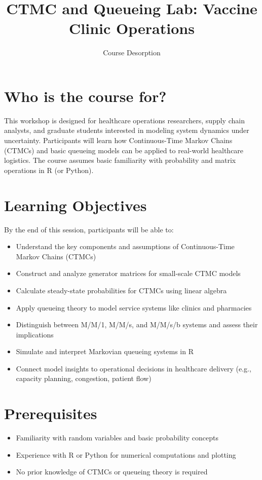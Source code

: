 \documentclass[
]{article}
\title{CTMC and Queueing Lab: Vaccine Clinic Operations}
\subtitle{Course Desorption}
\author{}
\date{}
\providecommand{\tightlist}{%
  \setlength{\itemsep}{0pt}\setlength{\parskip}{0pt}}\usepackage{longtable,booktabs,array}
\begin{document}
\maketitle


\section{Who is the course for?}\label{who-is-the-course-for}

This workshop is designed for healthcare operations researchers, supply
chain analysts, and graduate students interested in modeling system
dynamics under uncertainty. Participants will learn how Continuous-Time
Markov Chains (CTMCs) and basic queueing models can be applied to
real-world healthcare logistics. The course assumes basic familiarity
with probability and matrix operations in R (or Python).

\section{Learning Objectives}\label{learning-objectives}

By the end of this session, participants will be able to:

\begin{itemize}
\tightlist
\item
  Understand the key components and assumptions of Continuous-Time
  Markov Chains (CTMCs)
\item
  Construct and analyze generator matrices for small-scale CTMC models
\item
  Calculate steady-state probabilities for CTMCs using linear algebra
\item
  Apply queueing theory to model service systems like clinics and
  pharmacies
\item
  Distinguish between M/M/1, M/M/s, and M/M/s/b systems and assess their
  implications
\item
  Simulate and interpret Markovian queueing systems in R
\item
  Connect model insights to operational decisions in healthcare delivery
  (e.g., capacity planning, congestion, patient flow)
\end{itemize}

\section{Prerequisites}\label{prerequisites}

\begin{itemize}
\tightlist
\item
  Familiarity with random variables and basic probability concepts
\item
  Experience with R or Python for numerical computations and plotting
\item
  No prior knowledge of CTMCs or queueing theory is required
\end{itemize}
\end{document}
